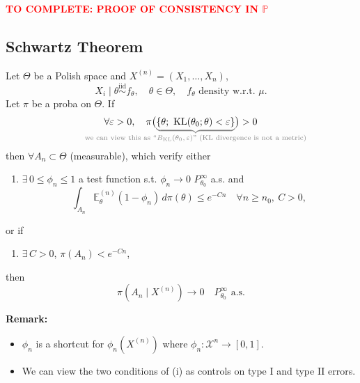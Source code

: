\documentclass[11pt, a4paper]{article}
\newcommand{\KL}{\mathrm{KL}}
\newcommand{\annot}[1]{\textcolor{gray}{\text{#1}}}
\newcommand{\gunderbrace}[2]{{\color{gray}\underbrace{\color{black}#1}_{#2}}}
\newcounter{theorem}[section]
\begin{document}
\textcolor{red}{\textbf{TO COMPLETE: PROOF OF CONSISTENCY IN $\mathbb{P}$}}

\subsection{Schwartz Theorem}

\begin{theorem}[Schwartz]
Let $\Theta$ be a Polish space and $X^{(n)} = (X_1, \dots, X_n)$,
\[ X_i \mid \theta \overset{\text{iid}}{\sim} f_\theta, \quad \theta \in \Theta, \quad f_\theta \text{ density w.r.t. } \mu. \]
Let $\pi$ be a proba on $\Theta$. If
\[ \forall \varepsilon > 0, \quad \pi\big(\gunderbrace{\{\theta;\ \KL(\theta_0;\theta) < \varepsilon\}}{\mathclap{\annot{we can view this as ``$B_{\KL}(\theta_0,\varepsilon)$'' (KL divergence is not a metric)}}}\big) > 0 \]
then $\forall A_n \subset \Theta$ (measurable), which verify either
\begin{enumerate}[label=\roman*)]
    \item $\exists\, 0 \le \phi_n \le 1$ a test function s.t. $\phi_n \longrightarrow 0$ $P_{\theta_0}^{\infty}$ a.s. and
    \[ \int_{A_n} \mathbb{E}_\theta^{(n)}(1-\phi_n)\, d\pi(\theta) \le e^{-Cn} \quad \forall n \ge n_0,\ C > 0, \]
\end{enumerate}
or if
\begin{enumerate}[label=\roman*), resume]
    \item $\exists\, C > 0$, $\pi(A_n) < e^{-Cn}$,
\end{enumerate}
then
\[ \pi(A_n \mid X^{(n)}) \longrightarrow 0 \quad P_{\theta_0}^{\infty} \text{ a.s.} \]
\end{theorem}

\noindent\textbf{Remark:}
\begin{itemize}
    \item $\phi_n$ is a shortcut for $\phi_n(X^{(n)})$ where $\phi_n : \mathcal{X}^n \longrightarrow [0, 1]$.
    \item We can view the two conditions of (i) as controls on type I and type II errors.
\end{itemize}
\end{document}
